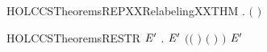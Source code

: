 \begin{SaveVerbatim}{HOLCCSTheoremsREPXXRelabelingXXTHM}
\HOLTokenTurnstile{} \HOLSymConst{\HOLTokenForall{}}.  \ensuremath{(} \ensuremath{)}
\end{SaveVerbatim}
\newcommand{\HOLCCSTheoremsREPXXRelabelingXXTHM}{\UseVerbatim{HOLCCSTheoremsREPXXRelabelingXXTHM}}
\begin{SaveVerbatim}{HOLCCSTheoremsRESTR}
\HOLTokenTurnstile{} \HOLSymConst{\HOLTokenForall{}}  \ensuremath{\HOLBoundVar{E}\sp{\prime}}  .
        \HOLTokenTransBegin{}\HOLTokenTransEnd \ensuremath{\HOLBoundVar{E}\sp{\prime}} \HOLSymConst{\HOLTokenConj{}}
       \ensuremath{(}\ensuremath{(} \HOLSymConst{\ensuremath{=}} \HOLConst{\ensuremath{\tau}}\ensuremath{)} \HOLSymConst{\HOLTokenDisj{}} \ensuremath{(} \HOLSymConst{\ensuremath{=}}  \ensuremath{)} \HOLSymConst{\HOLTokenConj{}}  \HOLConst{\HOLTokenNotIn{}}  \HOLSymConst{\HOLTokenConj{}}   \HOLConst{\HOLTokenNotIn{}} \ensuremath{)} \HOLSymConst{\HOLTokenImp{}}
          \HOLTokenTransBegin{}\HOLTokenTransEnd {}  \ensuremath{\HOLBoundVar{E}\sp{\prime}}
\end{SaveVerbatim}
\newcommand{\HOLCCSTheoremsRESTR}{\UseVerbatim{HOLCCSTheoremsRESTR}}
